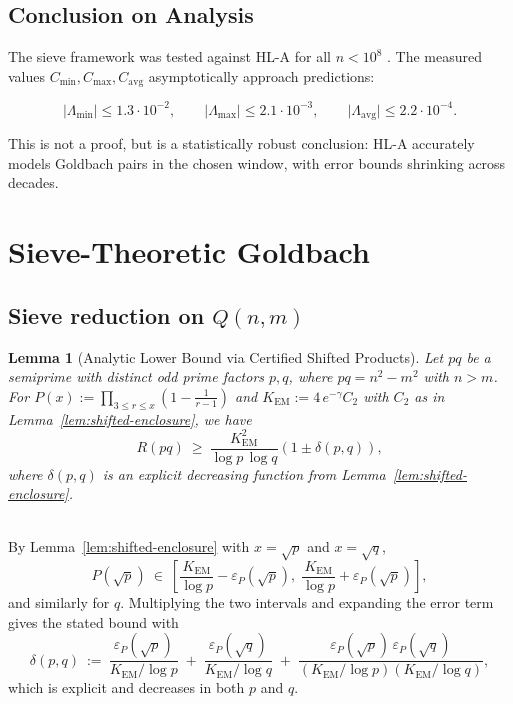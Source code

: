 \documentclass[11pt]{article}
\makeatletter
\theoremstyle{inline}
\theoremstyle{break}
\newtheorem{lemma}{Lemma}
\renewenvironment{proof}[1][\proofname]{%
  \par\pushQED{\qed}%
  \normalfont \topsep6\p@\@plus6\p@\relax
  \trivlist
  \item[\hskip\labelsep
        \itshape
    #1\@addpunct{.}]\mbox{}\\  %
}{%
  \popQED\endtrivlist\@endpefalse
}
\theoremstyle{break}
\theoremstyle{break}
\theoremstyle{break}
\theoremstyle{break}
\theoremstyle{break}
\theoremstyle{break}
\theoremstyle{inline}
\newcommand{\xSecondLambdaMinLimit}{1.3\cdot 10^{-2}} %
\newcommand{\xSecondLambdaMaxLimit}{2.1\cdot 10^{-3}} %
\newcommand{\xSecondLambdaAvgLimit}{2.2\cdot 10^{-4}} %
\newcommand{\tavg}{{\scriptscriptstyle\mathrm{avg}}}
\newcommand{\Cmeas}{C}              %
\newcommand{\Kem}{K_{\mathrm{EM}}}              %
\makeatother
\begin{document}

\subsection{Conclusion on Analysis}

The sieve framework was tested against HL-A for all \( n<10^8 \) . The measured values \( \Cmeas_{\min},\Cmeas_{\max},\Cmeas_{\tavg} \) asymptotically approach predictions:

\begin{equation}
\lvert \Lambda_{\min} \rvert \le \xSecondLambdaMinLimit,\qquad
\lvert \Lambda_{\max} \rvert \le \xSecondLambdaMaxLimit,\qquad
\lvert \Lambda_{\tavg} \rvert \le \xSecondLambdaAvgLimit.
\end{equation}

This is not a proof, but is a statistically robust conclusion: HL-A accurately models Goldbach pairs in the chosen window, with error bounds shrinking across decades.

\section{Sieve-Theoretic Goldbach}\label{sec:sgb}

\subsection{Sieve reduction on \( Q(n,m) \)}\label{sec:reduction}
\begin{lemma}[Analytic Lower Bound via Certified Shifted Products]
\label{lem:analytic-lower-bound-reduction}
Let \( pq \) be a semiprime with distinct odd prime factors \( p,q \), where \( pq=n^2-m^2 \) with \( n>m \). 
For \( P(x):=\prod_{3\le r\le x}(1-\tfrac{1}{r-1}) \) and \( \Kem:=4\,e^{-\gamma}C_2 \) with \( C_2 \) as in Lemma~\ref{lem:shifted-enclosure}, we have
\begin{equation}
R(pq)\ \ge\ \frac{\Kem^2}{\log p\,\log q}
\left(1 \pm \delta(p,q)\right),
\end{equation}
where \( \delta(p,q) \) is an explicit decreasing function from Lemma~\ref{lem:shifted-enclosure}.
\end{lemma}

\begin{proof}
By Lemma~\ref{lem:shifted-enclosure} with \( x=\sqrt{p} \) and \( x=\sqrt{q} \),
\begin{equation}
P(\sqrt{p})\ \in\ \left[\frac{\Kem}{\log p} - \varepsilon_P(\sqrt{p}),\; \frac{\Kem}{\log p} + \varepsilon_P(\sqrt{p})\right],
\end{equation}
and similarly for \( q \). Multiplying the two intervals and expanding the error term gives the stated bound with
\begin{equation}
\delta(p,q)\ :=\ \frac{\varepsilon_P(\sqrt{p})}{\Kem/\log p} \;+\; \frac{\varepsilon_P(\sqrt{q})}{\Kem/\log q} \;+\; \frac{\varepsilon_P(\sqrt{p})\,\varepsilon_P(\sqrt{q})}{(\Kem/\log p)(\Kem/\log q)},
\end{equation}
which is explicit and decreases in both \( p \) and \( q \).
\end{proof}
\end{document}
